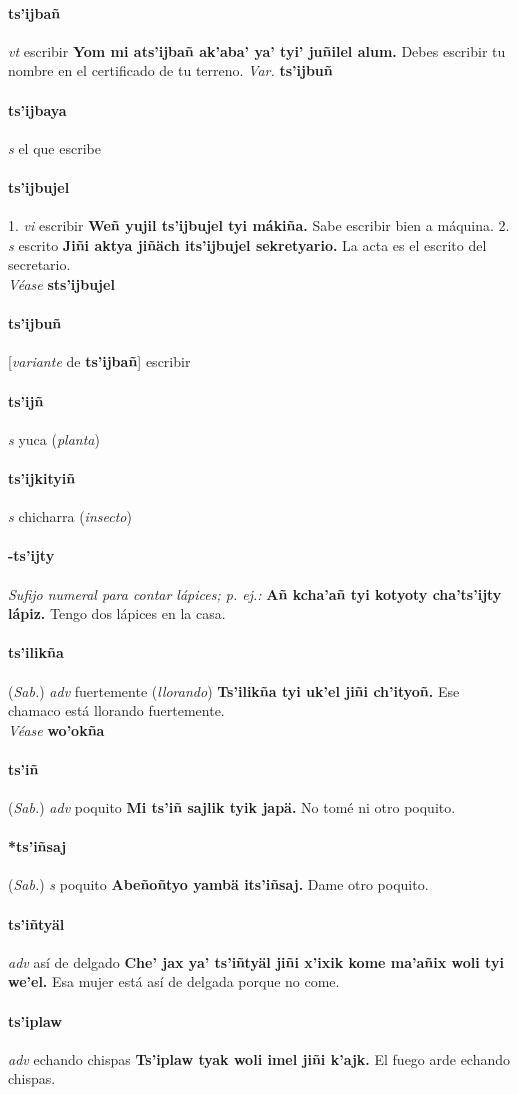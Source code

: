\documentclass{scrbook}
\newcommand{\entry}[1]{\paragraph{#1}}
\newcommand{\onedefinition}[1]{#1.}
\newcommand{\nontranslationdef}[1]{\textit{#1}}
\newcommand{\partofspeech}[1]{\textit{#1}}
\newcommand{\spanishtranslation}[1]{#1}
\newcommand{\clarification}[1]{(\textit{#1})}
\newcommand{\cholexample}[1]{\textbf{#1}}
\newcommand{\exampletranslation}[1]{#1}
\newcommand{\alsosee}[1]{\\\textit{Véase} \textbf{#1}}
\newcommand{\relevantdialect}[1]{(\textit{#1})}
\newcommand{\variation}[1]{\textit{Var.} \textbf{#1}}
\newcommand{\conjugationtense}[1]{[\textit{#1}}
\newcommand{\conjugationverb}[1]{de \textbf{#1}]}
\begin{document}
\begin{multicols}{2}
\entry{ts'ijbañ}
\partofspeech{vt}
\spanishtranslation{escribir}
\cholexample{Yom mi ats'ijbañ ak'aba' ya' tyi' juñilel alum.}
\exampletranslation{Debes escribir tu nombre en el certificado de tu terreno.}
\variation{ts'ijbuñ}

\entry{ts'ijbaya}
\partofspeech{s}
\spanishtranslation{el que escribe}

\entry{ts'ijbujel}
\onedefinition{1}
\partofspeech{vi}
\spanishtranslation{escribir}
\cholexample{Weñ yujil ts'ijbujel tyi mákiña.}
\exampletranslation{Sabe escribir bien a máquina.}
\onedefinition{2}
\partofspeech{s}
\spanishtranslation{escrito}
\cholexample{Jiñi aktya jiñäch its'ijbujel sekretyario.}
\exampletranslation{La acta es el escrito del secretario.}
\alsosee{sts'ijbujel}

\entry{ts'ijbuñ}
\conjugationtense{variante}
\conjugationverb{ts'ijbañ}
\spanishtranslation{escribir}

\entry{ts'ijñ}
\partofspeech{s}
\spanishtranslation{yuca}
\clarification{planta}

\entry{ts'ijkityiñ}
\partofspeech{s}
\spanishtranslation{chicharra}
\clarification{insecto}

\entry{-ts'ijty}
\nontranslationdef{Sufijo numeral para contar lápices; p. ej.:}
\cholexample{Añ kcha'añ tyi kotyoty cha'ts'ijty lápiz.}
\exampletranslation{Tengo dos lápices en la casa.}

\entry{ts'ilikña}
\relevantdialect{Sab.}
\partofspeech{adv}
\spanishtranslation{fuertemente}
\clarification{llorando}
\cholexample{Ts'ilikña tyi uk'el jiñi ch'ityoñ.}
\exampletranslation{Ese chamaco está llorando fuertemente.}
\alsosee{wo'okña}

\entry{ts'iñ}
\relevantdialect{Sab.}
\partofspeech{adv}
\spanishtranslation{poquito}
\cholexample{Mi ts'iñ sajlik tyik japä.}
\exampletranslation{No tomé ni otro poquito.}

\entry{*ts'iñsaj}
\relevantdialect{Sab.}
\partofspeech{s}
\spanishtranslation{poquito}
\cholexample{Abeñoñtyo yambä its'iñsaj.}
\exampletranslation{Dame otro poquito.}

\entry{ts'iñtyäl}
\partofspeech{adv}
\spanishtranslation{así de delgado}
\cholexample{Che' jax ya' ts'iñtyäl jiñi x'ixik kome ma'añix woli tyi we'el.}
\exampletranslation{Esa mujer está así de delgada porque no come.}

\entry{ts'iplaw}
\partofspeech{adv}
\spanishtranslation{echando chispas}
\cholexample{Ts'iplaw tyak woli imel jiñi k'ajk.}
\exampletranslation{El fuego arde echando chispas.}


\end{multicols}
\end{document}
